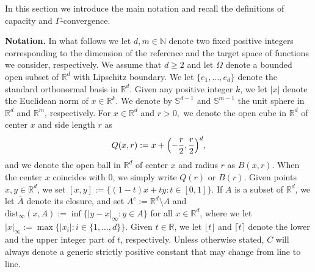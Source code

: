 \documentclass{article}
\theoremstyle{plain}
\theoremstyle{definition}
\def\rr{{\mathbb R}}
\numberwithin{equation}{section}
\begin{document}
In this section we introduce the main notation and recall the definitions of  capacity and $\Gamma$-convergence.

\smallskip

{\bf Notation.} In what follows we let $d,m \in \mathbb{N}$ denote two fixed positive integers corresponding to the dimension of the reference and the target space of functions we consider, respectively. We assume that $d\geq2$ and let $\Omega$ denote a bounded open subset of $\rr^d$ with Lipschitz boundary. We let $\{e_{1},\dots,e_{d}\}$ denote the standard orthonormal basis in $\mathbb{R}^{d}$. Given any positive integer $k$, we let $|x|$ denote the Euclidean norm of $x\in \rr^k$. We denote by $\mathbb{S}^{d-1}$ and $\mathbb{S}^{m-1}$ the unit sphere in $\mathbb{R}^{d}$ and $\rr^m$, respectively. For $x\in\rr^d$ and $r>0,$ we denote the open cube in $\mathbb{R}^{d}$ of center $x$
and side length $r$ as
\begin{equation*}
    Q(x,r):=x+\Bigl(-\frac{r}{2},\frac{r}{2}\Bigr)^{d},
\end{equation*}
and we denote the open ball in $\mathbb{R}^{d}$ of center $x$
and radius $r$ as $B(x,r)$. When the center $x$ coincides with $0$, we simply write $Q(r)$ or $B(r)$. Given points $x,y\in \mathbb R^d$, we set $[x,y]:=\{(1-t)x+ty: t\in[0,1]\}$. If $A$ is a subset of $\mathbb{R}^{d}$, we let $\overline{A}$ denote its closure, and set $A^c:=\rr^d\setminus A$ and $\text{dist}_\infty(x,A):=\inf\{|y-x|_\infty:y \in A\}$ for all $x\in \rr^d$, where we let $|x|_\infty:=\max\{|x_i|:i\in\{1,\dots,d\}\}$. Given $t \in \mathbb{R}$, we let  $\lfloor t\rfloor$ and $\lceil t\rceil$ denote the lower and the upper integer part of $t$, respectively. Unless otherwise stated, $C$ will always denote a generic strictly positive constant that may change from line to line.

\smallskip
\end{document}
